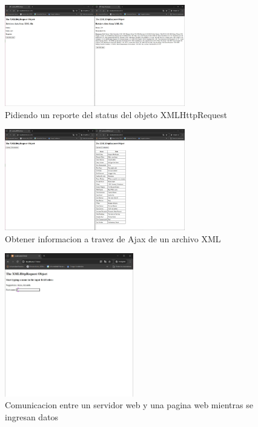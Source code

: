 \begin{figure}[H]
      \centering
      \includegraphics[width=0.7\textwidth]{img/ex5.jpg}
      \caption{Pidiendo un reporte del status del objeto XMLHttpRequest}
      \end{figure}

\begin{figure}[H]
    \centering
    \includegraphics[width=0.7\textwidth]{img/ex6.jpg}
    \caption{Obtener informacion a travez de Ajax de un archivo XML}
    \end{figure}

\begin{figure}[H]
  \centering
  \includegraphics[width=0.5\textwidth]{img/ex7.jpg}
  \caption{Comunicacion entre un servidor web y una pagina web mientras se ingresan datos}
  \end{figure}

